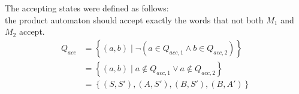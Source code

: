 The accepting states were defined as follows:\\
the product automaton should accept exactly the words that not both $M_1$ and $M_2$ accept.
\begin{align*}
    Q_{acc}&=\left\{(a,b) \mid \neg(a \in Q_{acc,1} \wedge b \in Q_{acc,2})\right\}\\
    &= \left\{(a,b) \mid a \notin Q_{acc,1} \vee a \notin Q_{acc,2}\right\}\\
    &= \left\{ (S,S'),(A,S'),(B,S'),(B,A')\right\}
\end{align*}



